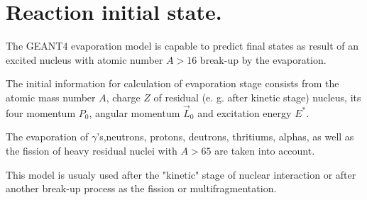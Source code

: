 \section{Reaction initial state.}

\hspace{1.0em} The GEANT4 evaporation model is capable to predict 
final states as result of an excited nucleus with atomic number $A > 16$ 
break-up by the evaporation. 
 
The initial information for calculation of evaporation
stage consists from the atomic mass number $A$, charge $Z$ of residual
(e. g. after kinetic stage) nucleus, its four momentum $P_0$, angular 
momentum $\vec{L}_0$ and  excitation energy $E^{*}$.  

The evaporation
of $\gamma$'s,neutrons, protons, deutrons, thritiums, alphas, as well as 
the fission of heavy residual nuclei with $A > 65$ 
 are taken into account. 

This model is usualy used after the "kinetic" stage of nuclear interaction or 
after another break-up process as the fission or multifragmentation.
